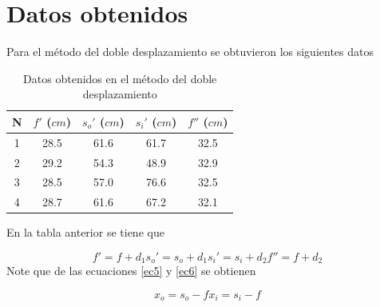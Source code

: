\documentclass[13,twocolumn,letterpaper]{article}
\begin{document}
\section{Datos obtenidos}
{
	
		 

Para el m\'etodo del doble desplazamiento se obtuvieron los siguientes datos
\begin{table}[htb]
	\centering
	\begin{tabular}{ccccc}
		N & $f'$ ($cm$) & $s_{o}'$ ($cm$) & $s_{i}'$  ($cm$) & $f''$ ($cm$)  \\ \midrule
		1 &	28.5 & 61.6	& 61.7	& 32.5	\\
		2 &	29.2 & 54.3	& 48.9	& 32.9	\\
		3 &	28.5 & 57.0	& 76.6	& 32.5	\\
		4 &	28.7 & 61.6	& 67.2	& 32.1	\\\hline
	\end{tabular}
	\caption{Datos obtenidos en el m\'etodo del doble desplazamiento} \label{tabla1}
\end{table}

En la tabla anterior se tiene que 

\begin{subequations}
	\begin{equation}\label{ec12a}
		f'=f+d_{1}
	\end{equation}
	
	\begin{equation}\label{ec12b}
		s_{o}'=s_{o}+d_{1}
	\end{equation}
	
	\begin{equation}\label{ec12c}
		s_{i}'=s_{i}+d_{2}
	\end{equation}
	
	\begin{equation}\label{ec12d}
		f''=f+d_{2}
	\end{equation}
\end{subequations}
Note que de las ecuaciones \ref{ec5} y \ref{ec6} se obtienen

\begin{subequations}
	\begin{equation}\label{ec13a}
		x_{o}=s_{o}-f
	\end{equation}
	
	\begin{equation}\label{ec13b}
	x_{i}=s_{i}-f
	\end{equation}
\end{subequations}  

}
\end{document}
